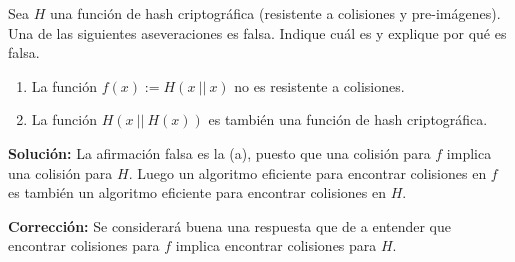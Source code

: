 Sea $H$ una función de hash criptográfica (resistente a colisiones y pre-imágenes). Una de las siguientes aseveraciones es falsa. Indique cuál es y explique por qué es falsa.
\begin{enumerate}
  \item La función $f(x):=H(x\ ||\ x)$ no es resistente a colisiones.
  \item La función $H(x\ ||\ H(x))$ es también una función de hash criptográfica.
\end{enumerate}

\textbf{Solución:} La afirmación falsa es la (a), puesto que una colisión para $f$ implica una colisión para $H$. Luego un algoritmo eficiente para encontrar colisiones en $f$ es también un algoritmo eficiente para encontrar colisiones en $H$.

\textbf{Corrección:} Se considerará buena una respuesta que de a entender que encontrar colisiones para $f$ implica encontrar colisiones para $H$.

